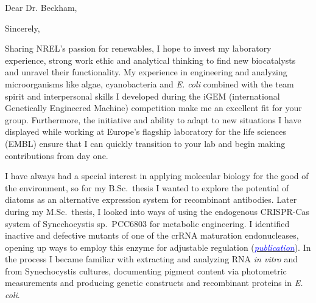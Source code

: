 \documentclass[11pt,a4paper,sans]{moderncv}
\begin{document}
\vspace*{-10mm}
\date{\today}
\opening{Dear Dr.  Beckham,}
\closing{Sincerely,\vspace{-2mm}}
\makelettertitle
\begin{spacing}{1.15}
\vspace*{-3mm}
Sharing NREL's passion for renewables, I hope to invest my laboratory experience, strong work ethic and analytical thinking to find new biocatalysts and unravel their functionality.
My experience in engineering and analyzing microorganisms like algae, cyanobacteria and \textit{E. coli} combined with the team spirit and interpersonal skills I developed during the iGEM (international Genetically Engineered Machine) competition make me an excellent fit for your group. 
Furthermore, the initiative and ability to adapt to new situations I have displayed while working at Europe's flagship laboratory for the life sciences (EMBL) ensure that I can quickly transition to your lab and begin making contributions from day one.\par%

I have always had a special interest in applying molecular biology for the good of the environment, so for my B.Sc.\ thesis I wanted to explore the potential of diatoms as an alternative expression system for recombinant antibodies. 
Later during my M.Sc.\ thesis, I looked into ways of using the endogenous CRISPR-Cas system of Synechocystis sp.\ PCC6803 for metabolic engineering. I identified inactive and defective mutants of one of the crRNA maturation endonucleases, opening up ways to employ this enzyme for adjustable regulation ({\href{https://www.tandfonline.com/eprint/vmAQ3vjYGdZIZpIKQTIT/full}{\textcolor{blue}{{\textit{publication}}}}}).
In the process I became familiar with extracting and analyzing RNA \textit{in vitro} and from Synechocystis cultures, documenting pigment content via photometric measurements and producing genetic constructs and recombinant proteins in \textit{E. coli}.
\par%
 

\end{spacing}
\end{document}
